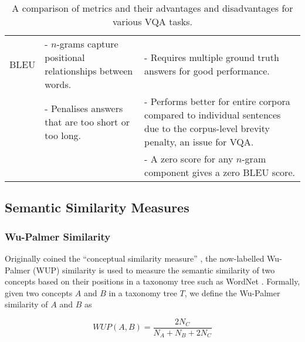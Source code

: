 \begin{table}[htbp]
\begin{footnotesize}
\begin{tabularx}{\linewidth}{@{}lLL@{}}
            BLEU                                & - \(n\)-grams capture positional relationships between words.                              & - Requires multiple ground truth answers for good performance.                                                                                                          \\
                                                & - Penalises answers that are too short or too long.                                        & - Performs better for entire corpora compared to individual sentences due to the corpus-level brevity penalty, an issue for VQA.                                        \\
                                                &                                                                                            & - A zero score for any \(n\)-gram component gives a zero BLEU score.                                                                                                    \\\bottomrule
    \end{tabularx}
    \end{footnotesize}
    \caption[Advantages and disadvantages of metrics for various VQA tasks]{A comparison of metrics and their advantages and disadvantages for various VQA tasks.}
    \label{tab:vqa_metrics_comparison}
\end{table}

\subsection{Semantic Similarity Measures}

\subsubsection{Wu-Palmer Similarity}

Originally coined the ``conceptual similarity measure'' \cite{wu1994verbs}, the now-labelled Wu-Palmer (WUP) similarity is used to measure the semantic similarity of two concepts based on their positions in a taxonomy tree such as WordNet \cite{miller1995wordnet}. Formally, given two concepts \(A\) and \(B\) in a taxonomy tree \(T\), we define the Wu-Palmer similarity of \(A\) and \(B\) as

\begin{equation}
    WUP(A, B) = \frac{2 N_C}{N_A + N_B + 2 N_C}
    \label{equation:wup}
\end{equation}


